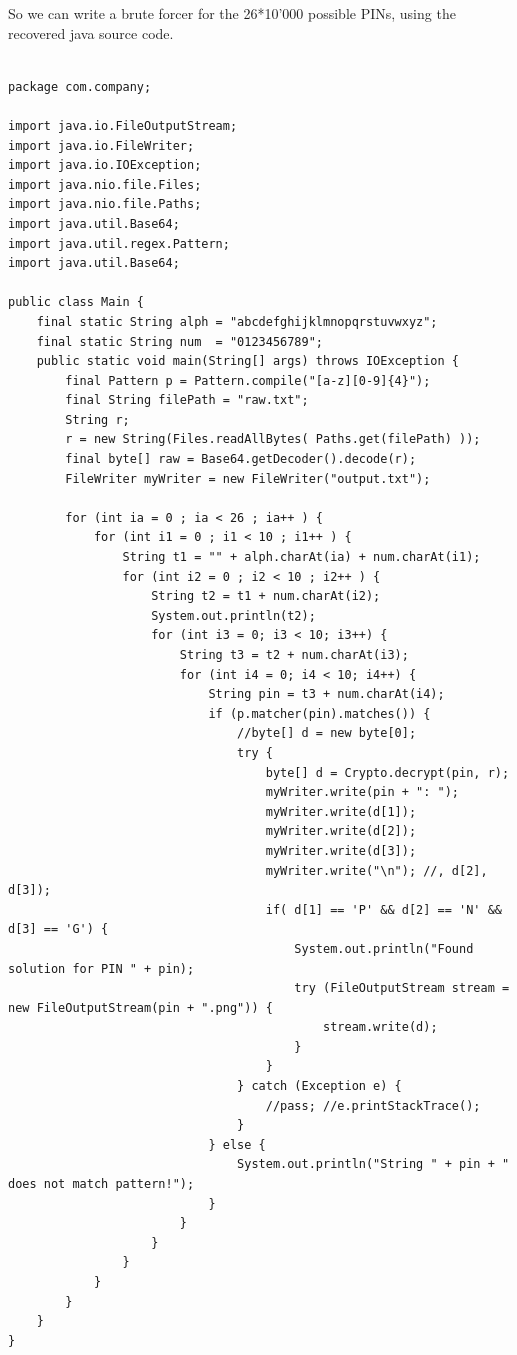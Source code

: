 \documentclass[english,a4paper,nols,noindent]{tufte-handout}
\begin{document}
So we can write a brute forcer for the 26*10'000 possible PINs, using the recovered java source code.

\begin{verbatim}

package com.company;

import java.io.FileOutputStream;
import java.io.FileWriter;
import java.io.IOException;
import java.nio.file.Files;
import java.nio.file.Paths;
import java.util.Base64;
import java.util.regex.Pattern;
import java.util.Base64;

public class Main {
    final static String alph = "abcdefghijklmnopqrstuvwxyz";
    final static String num  = "0123456789";
    public static void main(String[] args) throws IOException {
        final Pattern p = Pattern.compile("[a-z][0-9]{4}");
        final String filePath = "raw.txt";
        String r;
        r = new String(Files.readAllBytes( Paths.get(filePath) ));
        final byte[] raw = Base64.getDecoder().decode(r);
        FileWriter myWriter = new FileWriter("output.txt");

        for (int ia = 0 ; ia < 26 ; ia++ ) {
            for (int i1 = 0 ; i1 < 10 ; i1++ ) {
                String t1 = "" + alph.charAt(ia) + num.charAt(i1);
                for (int i2 = 0 ; i2 < 10 ; i2++ ) {
                    String t2 = t1 + num.charAt(i2);
                    System.out.println(t2);
                    for (int i3 = 0; i3 < 10; i3++) {
                        String t3 = t2 + num.charAt(i3);
                        for (int i4 = 0; i4 < 10; i4++) {
                            String pin = t3 + num.charAt(i4);
                            if (p.matcher(pin).matches()) {
                                //byte[] d = new byte[0];
                                try {
                                    byte[] d = Crypto.decrypt(pin, r);
                                    myWriter.write(pin + ": ");
                                    myWriter.write(d[1]);
                                    myWriter.write(d[2]);
                                    myWriter.write(d[3]);
                                    myWriter.write("\n"); //, d[2], d[3]);
                                    if( d[1] == 'P' && d[2] == 'N' && d[3] == 'G') {
                                        System.out.println("Found solution for PIN " + pin);
                                        try (FileOutputStream stream = new FileOutputStream(pin + ".png")) {
                                            stream.write(d);
                                        }
                                    }
                                } catch (Exception e) {
                                    //pass; //e.printStackTrace();
                                }
                            } else {
                                System.out.println("String " + pin + " does not match pattern!");
                            }
                        }
                    }
                }
            }
        }
    }
}
\end{verbatim}
\end{document}
